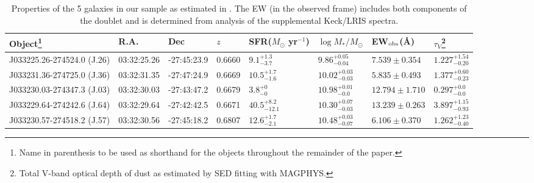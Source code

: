 \documentclass[twocolumn]{aastex61}
\begin{document}
\begin{table}[t]
\centering
\caption{Properties of the 5 galaxies in our sample as estimated in \cite{Rubin_2014}. The EW (in the observed frame) includes both components of the  doublet and is 
determined from analysis of the supplemental Keck/LRIS spectra.}
\begin{tabular}{llllllll} \hline \hline
Object\footnote{ Name in parenthesis to be used as shorthand for the objects throughout the remainder of the paper. } & R.A. & Dec  & $z$ & SFR($M_{\odot}$ yr$^{-1}$) & $\log{M_{*}/M_{\odot}}$ & EW$_{\rm{obs}}$(\AA) & $\tau_V$\footnote{ Total V-band optical depth of dust as estimated by SED fitting with MAGPHYS. }\smallskip      \\ \hline 
J033225.26-274524.0 (J.26)      & 03:32:25.26 & -27:45:23.9 & 0.6660 & $9.1_{-3.7}^{+1.3}$& $9.86_{-0.04}^{+0.05}$ & $7.539\pm 0.354$ &  $1.227_{-0.20}^{+1.54}$\\ 

J033231.36-274725.0 (J.36)      & 03:32:31.35 & -27:47:24.9 &   0.6669 & $10.5_{-1.6}^{+1.7}$ & $10.02_{-0.03}^{+0.03}$&$5.835 \pm 0.493$ & $1.377_{-0.23}^{+0.60}$\\

J033230.03-274347.3  (J.03)     & 03:32:30.03 & -27:43:47.2  &   0.6679 & $3.8_{-0}^{+0}$ & $10.98_{-0.0}^{+0.01}$ &$12.794 \pm 1.710$ & $0.297_{-0.0}^{+0.0}$ \\

J033229.64-274242.6  (J.64)    & 03:32:29.64 & -27:42:42.5 & 0.6671 & $40.5_{-12.1}^{+8.2}$ & $10.30_{-0.03}^{+0.07}$ &$13.239 \pm 0.263$ & $3.897_{-0.93}^{+1.15}$\\

J033230.57-274518.2  (J.57)    & 03:32:30.56 & -27:45:18.2 &   0.6807  & $12.6_{-2.1}^{+1.7}$ & $10.48_{-0.07}^{+0.03}$ &$6.106 \pm 0.370$ & $1.262_{-0.40}^{+1.23}$ \\
\hline 
\end{tabular}
\tablenotemark{}
\label{tab:prop}
\end{table}
\end{document}
